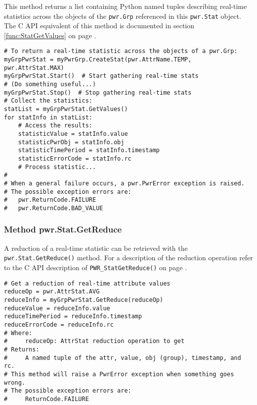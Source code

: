 \documentclass[12pt]{report} %
\begin{document}
\begin{appendices}
This method returns a list containing Python named tuples describing real-time statistics across
the objects of the \texttt{pwr.Grp} referenced in this \texttt{pwr.Stat} object.
The C API equivalent of this method is documented in section
\ref{func:StatGetValues} on page \pageref{func:StatGetValues}.

\begin{center}\begin{minipage}{.95\linewidth}\begin{lstlisting}
# To return a real-time statistic across the objects of a pwr.Grp:
myGrpPwrStat = myPwrGrp.CreateStat(pwr.AttrName.TEMP, pwr.AttrStat.MAX)
myGrpPwrStat.Start()  # Start gathering real-time stats
# (Do something useful...)
myGrpPwrStat.Stop()  # Stop gathering real-time stats
# Collect the statistics:
statList = myGrpPwrStat.GetValues()
for statInfo in statList:
    # Access the results:
    statisticValue = statInfo.value
    statisticPwrObj = statInfo.obj
    statisticTimePeriod = statInfo.timestamp
    statisticErrorCode = statInfo.rc
    # Process statistic...
#
# When a general failure occurs, a pwr.PwrError exception is raised.
# The possible exception errors are:
#   pwr.ReturnCode.FAILURE
#   pwr.ReturnCode.BAD_VALUE
\end{lstlisting}\end{minipage}\end{center}

\subsubsection{Method pwr.Stat.GetReduce} \label{meth:StatGetReduce}

A reduction of a real-time statistic can be retrieved with the
\texttt{pwr.Stat.GetReduce()} method. For a description of the reduction
operation refer to the C API description of \texttt{PWR_StatGetReduce()} on page
\pageref{func:StatGetReduce}.

\begin{center}\begin{minipage}{.95\linewidth}\begin{lstlisting}
# Get a reduction of real-time attribute values
reduceOp = pwr.AttrStat.AVG
reduceInfo = myGrpPwrStat.GetReduce(reduceOp)
reduceValue = reduceInfo.value
reduceTimePeriod = reduceInfo.timestamp
reduceErrorCode = reduceInfo.rc
# Where:
#     reduceOp: AttrStat reduction operation to get
# Returns:
#     A named tuple of the attr, value, obj (group), timestamp, and rc.
# This method will raise a PwrError exception when something goes wrong.
# The possible exception errors are:
#     ReturnCode.FAILURE
\end{lstlisting}\end{minipage}\end{center}


\end{appendices}
\end{document}
